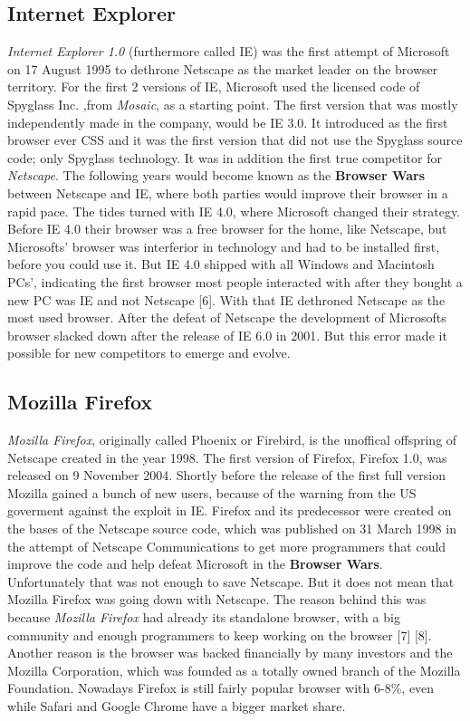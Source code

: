 \documentclass[runningheads]{llncs}
\begin{document}
		\subsection{Internet Explorer}
		\textit{Internet Explorer 1.0} (furthermore called IE) was the first attempt of Microsoft on 17 August 1995 to dethrone Netscape as the market leader on the browser territory. For the first 2 versions of IE, Microsoft used the licensed code of Spyglass Inc. ,from \textit{Mosaic}, as a starting point. The first version that was mostly independently made in the company, would be IE 3.0. It introduced as the first browser ever CSS and it was the first version that did not use the Spyglass source code; only Spyglass technology. It was in addition the first true competitor for \textit{Netscape}. The following years would become known as the \textbf{Browser Wars} between Netscape and IE, where both parties would improve their browser in a rapid pace. The tides turned with IE 4.0, where Microsoft changed their strategy. Before IE 4.0 their browser was a free browser for the home, like Netscape, but Microsofts' browser was interferior in technology and had to be installed first, before you could use it. But IE 4.0 shipped with all Windows and Macintosh PCs', indicating the first browser most people interacted with after they bought a new PC was IE and not Netscape [6]. With that IE dethroned Netscape as the most used browser. After the defeat of Netscape the development of Microsofts browser slacked down after the release of IE 6.0 in 2001. But this error made it possible for new competitors to emerge and evolve.
		\subsection{Mozilla Firefox}
		\textit{Mozilla Firefox}, originally called Phoenix or Firebird, is the unoffical offspring of Netscape created in the year 1998. The first version of Firefox, Firefox 1.0, was released on 9 November 2004. Shortly before the release of the first full version Mozilla gained a bunch of new users, because of the warning from the US goverment against the exploit in IE. Firefox and its predecessor were created on the bases of the Netscape source code, which was published on 31 March 1998 in the attempt of Netscape Communications to get more programmers that could improve the code and help defeat Microsoft in the \textbf{Browser Wars}. Unfortunately that was not enough to save Netscape. But it does not mean that Mozilla Firefox was going down with Netscape. The reason behind this was because \textit{Mozilla Firefox} had already its standalone browser, with a big community and enough  programmers  to keep working on the browser [7] [8]. Another reason is the browser was backed financially by many investors and the Mozilla Corporation, which was founded as a totally owned branch of the Mozilla Foundation. Nowadays Firefox is still fairly popular browser with 6-8\%, even while Safari and Google Chrome have a bigger market share.
\end{document}

